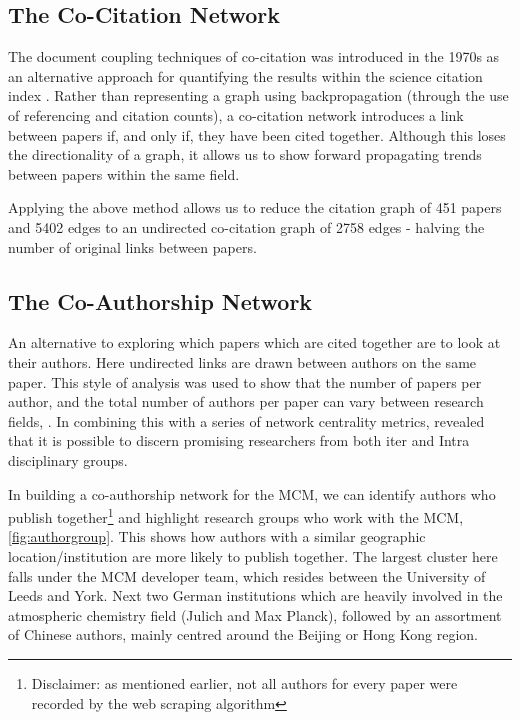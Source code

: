 \subsection{The Co-Citation Network}\label{sec:cocitep}

The document coupling techniques of co-citation was introduced in the 1970s as an alternative approach for quantifying the results within the science citation index \citep{cocite}. Rather than representing a graph using backpropagation (through the use of referencing and citation counts), a co-citation network introduces a link between papers if, and only if, they have been cited together. Although this loses the directionality of a graph, it allows us to show forward propagating trends between papers within the same field.

Applying the above method allows us to reduce the citation graph of 451 papers and 5402 edges to an undirected co-citation graph of 2758 edges - halving the number of original links between papers.

\subsection{The Co-Authorship Network}
An alternative to exploring which papers which are cited together are to look at their authors. Here undirected links are drawn between authors on the same paper. This style of analysis was used to show that the number of papers per author, and the total number of authors per paper can vary between research fields, \citep{newmancoauthor}. In combining this with a series of network centrality metrics, \citep{coauthornew} revealed that it is possible to discern promising researchers from both iter and Intra disciplinary groups.

In building a co-authorship network for the MCM, we can identify authors who publish together\footnote{ Disclaimer: as mentioned earlier, not all authors for every paper were recorded by the web scraping algorithm} and highlight research groups who work with the MCM, \autoref{fig:authorgroup}. This shows how authors with a similar geographic location/institution are more likely to publish together. The largest cluster here falls under the MCM developer team, which resides between the University of Leeds and York. Next two German institutions which are heavily involved in the atmospheric chemistry field (Julich and Max Planck), followed by an assortment of Chinese authors, mainly centred around the Beijing or Hong Kong region.


